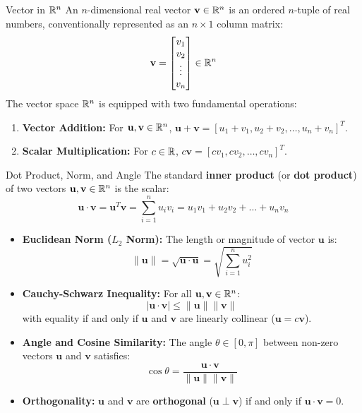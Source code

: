 \begin{definitionbox}{Vector in $\mathbb{R}^n$}
An $n$-dimensional real vector $\mathbf{v} \in \mathbb{R}^n$ is an ordered $n$-tuple of real numbers, conventionally represented as an $n \times 1$ column matrix:
\begin{equation}
\mathbf{v} = \begin{bmatrix} v_1 \\ v_2 \\ \vdots \\ v_n \end{bmatrix} \in \mathbb{R}^n
\end{equation}
The vector space $\mathbb{R}^n$ is equipped with two fundamental operations:
\begin{enumerate}
    \item \textbf{Vector Addition:} For $\mathbf{u}, \mathbf{v} \in \mathbb{R}^n$, $\mathbf{u} + \mathbf{v} = [u_1 + v_1, u_2 + v_2, \dots, u_n + v_n]^T$.
    \item \textbf{Scalar Multiplication:} For $c \in \mathbb{R}$, $c\mathbf{v} = [c v_1, c v_2, \dots, c v_n]^T$.
\end{enumerate}
\end{definitionbox}

\begin{definitionbox}{Dot Product, Norm, and Angle}
The standard \textbf{inner product} (or \textbf{dot product}) of two vectors $\mathbf{u}, \mathbf{v} \in \mathbb{R}^n$ is the scalar:
\begin{equation}
\mathbf{u} \cdot \mathbf{v} = \mathbf{u}^T \mathbf{v} = \sum_{i=1}^n u_i v_i = u_1 v_1 + u_2 v_2 + \dots + u_n v_n
\end{equation}
\begin{itemize}
    \item \textbf{Euclidean Norm ($L_2$ Norm):} The length or magnitude of vector $\mathbf{u}$ is:
    \begin{equation}
    \|\mathbf{u}\| = \sqrt{\mathbf{u} \cdot \mathbf{u}} = \sqrt{\sum_{i=1}^n u_i^2}
    \end{equation}
    \item \textbf{Cauchy-Schwarz Inequality:} For all $\mathbf{u}, \mathbf{v} \in \mathbb{R}^n$:
    \begin{equation}
    |\mathbf{u} \cdot \mathbf{v}| \le \|\mathbf{u}\| \|\mathbf{v}\|
    \end{equation}
    with equality if and only if $\mathbf{u}$ and $\mathbf{v}$ are linearly collinear ($\mathbf{u} = c \mathbf{v}$).
    \item \textbf{Angle and Cosine Similarity:} The angle $\theta \in [0, \pi]$ between non-zero vectors $\mathbf{u}$ and $\mathbf{v}$ satisfies:
    \begin{equation}
    \cos \theta = \frac{\mathbf{u} \cdot \mathbf{v}}{\|\mathbf{u}\| \|\mathbf{v}\|}
    \end{equation}
    \item \textbf{Orthogonality:} $\mathbf{u}$ and $\mathbf{v}$ are \textbf{orthogonal} ($\mathbf{u} \perp \mathbf{v}$) if and only if $\mathbf{u} \cdot \mathbf{v} = 0$.
\end{itemize}
\end{definitionbox}

